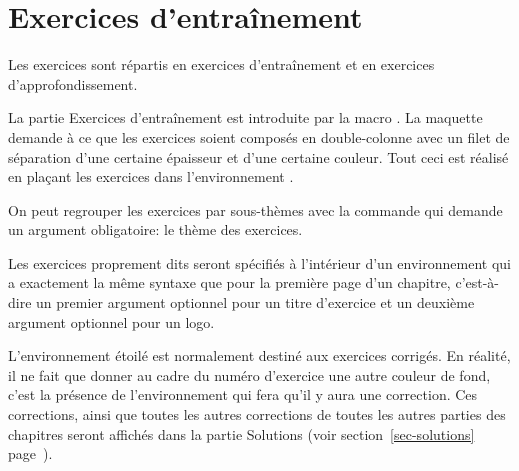 \documentclass[nocrop]{sesamanuel}
\begin{document}
\section{Exercices d'entraînement}
\label{sec-exercices-d-entrainement}
Les exercices sont répartis en exercices d'entraînement et en
exercices d'approfondissement. 

La partie Exercices d'entraînement est
introduite par la macro . La maquette demande à ce
que les exercices soient composés en double-colonne avec un filet de
séparation d'une certaine épaisseur et d'une certaine couleur. Tout
ceci est réalisé en plaçant les exercices dans l'environnement
.

On peut regrouper les exercices par sous-thèmes avec la commande
 qui demande un argument obligatoire: le thème des
exercices.

Les exercices proprement dits seront spécifiés à l'intérieur d'un
environnement  qui a exactement la même syntaxe que
pour la première page d'un chapitre, c'est-à-dire un premier argument
optionnel pour un titre d'exercice et un deuxième argument optionnel
pour un logo.

L'environnement étoilé est normalement destiné aux exercices
corrigés. En réalité, il ne fait que donner au cadre du numéro
d'exercice une autre couleur de fond, c'est la présence de
l'environnement  qui fera qu'il y aura une
correction. Ces corrections, ainsi que toutes les autres corrections
de toutes les autres parties des chapitres seront affichés dans la
partie Solutions (voir section~\ref{sec-solutions}
page~\pageref{sec-solutions}).
\end{document}
